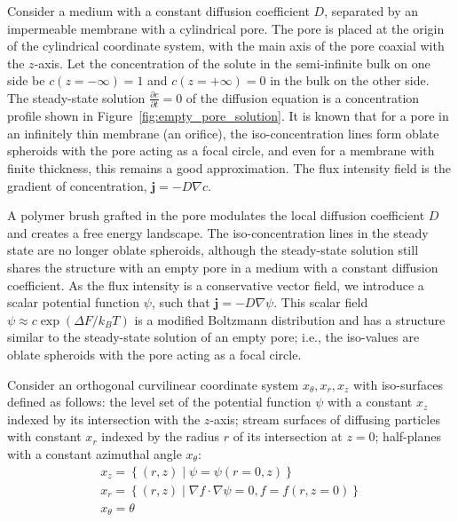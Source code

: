 \documentclass[10pt, a4paper]{article}
\begin{document}
\begin{multicols}{2}



Consider a medium with a constant diffusion coefficient $D$, separated by an impermeable membrane with a cylindrical pore.
The pore is placed at the origin of the cylindrical coordinate system, with the main axis of the pore coaxial with the $z$-axis.
Let the concentration of the solute in the semi-infinite bulk on one side be $c(z = -\infty) = 1$ and $c(z = +\infty) = 0$ in the bulk on the other side.
The steady-state solution $\frac{\partial c}{\partial t} = 0$ of the diffusion equation is a concentration profile shown in Figure~\ref{fig:empty_pore_solution}.
It is known that for a pore in an infinitely thin membrane (an orifice), the iso-concentration lines form oblate spheroids with the pore acting as a focal circle, and even for a membrane with finite thickness, this remains a good approximation.
The flux intensity field is the gradient of concentration, $\mathbf{j} = -D \nabla c$.

A polymer brush grafted in the pore modulates the local diffusion coefficient $D$ and creates a free energy landscape.
The iso-concentration lines in the steady state are no longer oblate spheroids, although the steady-state solution still shares the structure with an empty pore in a medium with a constant diffusion coefficient.
As the flux intensity is a conservative vector field, we introduce a scalar potential function $\psi$, such that $\mathbf{j} = -D \nabla \psi$.
This scalar field $\psi \approx c \exp(\Delta F / k_B T)$ is a modified Boltzmann distribution and has a structure similar to the steady-state solution of an empty pore; i.e., the iso-values are oblate spheroids with the pore acting as a focal circle.

Consider an orthogonal curvilinear coordinate system $x_{\theta}, x_{r}, x_{z}$ with iso-surfaces defined as follows:
the level set of the potential function $\psi$ with a constant $x_{z}$ indexed by its intersection with the $z$-axis;
stream surfaces of diffusing particles with constant $x_{r}$ indexed by the radius $r$ of its intersection at $z = 0$;
half-planes with a constant azimuthal angle $x_{\theta}$:
\begin{gather}
    x_z = \left\{ (r, z) \mid \psi = \psi(r = 0, z) \right\}
    \\
    x_r = \left\{ (r, z) \mid \nabla f \cdot \nabla \psi = 0, f = f(r, z = 0) \right\}
    \\
    x_{\theta} = \theta
\end{gather}


\end{multicols}
\end{document}
